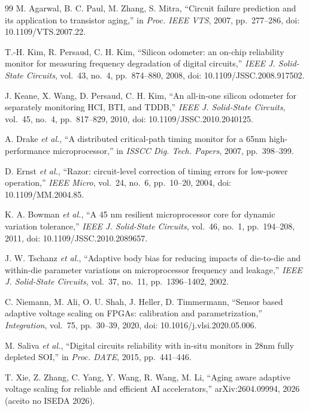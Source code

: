 \documentclass[11pt,a4paper]{article}
\begin{document}
\begin{thebibliography}{99}
 M. Agarwal, B. C. Paul, M. Zhang, S. Mitra, ``Circuit failure prediction and its application
to transistor aging,'' in \emph{Proc. IEEE VTS}, 2007, pp.~277--286, doi: 10.1109/VTS.2007.22.

 T.-H. Kim, R. Persaud, C. H. Kim, ``Silicon odometer: an on-chip reliability monitor for measuring
frequency degradation of digital circuits,'' \emph{IEEE J. Solid-State Circuits}, vol.~43, no.~4, pp.~874--880, 2008,
doi: 10.1109/JSSC.2008.917502.

 J. Keane, X. Wang, D. Persaud, C. H. Kim, ``An all-in-one silicon odometer for separately
monitoring HCI, BTI, and TDDB,'' \emph{IEEE J. Solid-State Circuits}, vol.~45, no.~4, pp.~817--829, 2010, doi:
10.1109/JSSC.2010.2040125.

 A. Drake \emph{et al.}, ``A distributed critical-path timing monitor for a 65nm high-performance
microprocessor,'' in \emph{ISSCC Dig. Tech. Papers}, 2007, pp.~398--399.

 D. Ernst \emph{et al.}, ``Razor: circuit-level correction of timing errors for low-power
operation,'' \emph{IEEE Micro}, vol.~24, no.~6, pp.~10--20, 2004, doi: 10.1109/MM.2004.85.

 K. A. Bowman \emph{et al.}, ``A 45 nm resilient microprocessor core for dynamic variation
tolerance,'' \emph{IEEE J. Solid-State Circuits}, vol.~46, no.~1, pp.~194--208, 2011, doi: 10.1109/JSSC.2010.2089657.

 J. W. Tschanz \emph{et al.}, ``Adaptive body bias for reducing impacts of die-to-die and within-die
parameter variations on microprocessor frequency and leakage,'' \emph{IEEE J. Solid-State Circuits}, vol.~37, no.~11,
pp.~1396--1402, 2002.

 C. Niemann, M. Ali, O. U. Shah, J. Heller, D. Timmermann, ``Sensor based adaptive voltage scaling on
FPGAs: calibration and parametrization,'' \emph{Integration}, vol.~75, pp.~30--39, 2020, doi: 10.1016/j.vlsi.2020.05.006.

 M. Saliva \emph{et al.}, ``Digital circuits reliability with in-situ monitors in 28nm fully
depleted SOI,'' in \emph{Proc. DATE}, 2015, pp.~441--446.

 T. Xie, Z. Zhang, C. Yang, Y. Wang, R. Wang, M. Li, ``Aging aware adaptive voltage scaling for
reliable and efficient AI accelerators,'' arXiv:2604.09994, 2026 (aceito no ISEDA 2026).


\end{thebibliography}
\end{document}
